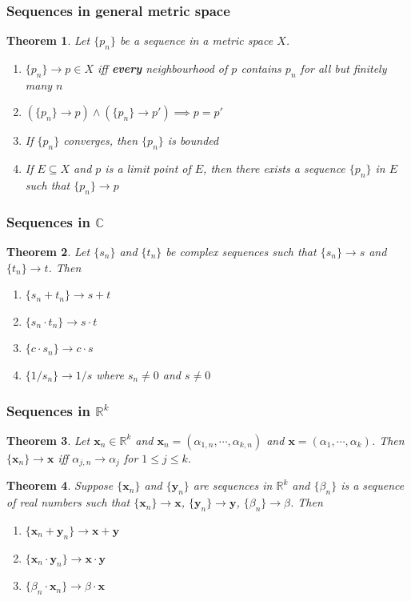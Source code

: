 \documentclass[a4paper,12pt]{report}
\newcommand{\R}{\mathbb{R}}
\newcommand{\tb}{\textbf}
\theoremstyle{plain}
\newtheorem{theorem}{\color{blue}Theorem}[chapter] %
\theoremstyle{definition}
\theoremstyle{remark}
\begin{document}
\subsubsection{Sequences in general metric space}
\begin{theorem}
Let $\{p_n\}$ be a sequence in a metric space $X$.
\begin{enumerate}
\item $\{p_n\}\to p\in X$ \emph{iff} \tb{every} neighbourhood of $p$ contains $p_n$ for all but finitely many $n$
\item $(\{p_n\}\to p)\wedge(\{p_n\}\to p')\implies p=p'$
\item If $\{p_n\}$ converges, then $\{p_n\}$ is bounded
\item If $E\subseteq X$ and $p$ is a limit point of $E$, then there exists a sequence $\{p_n\}$ in $E$ such that $\{p_n\}\to p$
\end{enumerate}
\end{theorem}
\subsubsection{Sequences in $\mathbb{C}$}
\begin{theorem}
Let $\{s_n\}$ and $\{t_n\}$ be complex sequences such that $\{s_n\}\to s$ and $\{t_n\}\to t$. Then
\begin{enumerate}
\item $\{s_n+t_n\}\to s+t$
\item $\{s_n\cdot t_n\}\to s\cdot t$
\item $\{c\cdot s_n\}\to c\cdot s$
\item $\{1/s_n\}\to 1/s$ where $s_n\neq 0$ and $s\neq 0$
\end{enumerate}
\end{theorem}
\subsubsection{Sequences in $\R^k$}
\begin{theorem}
Let $\mathbf{x}_n\in\R^k$ and $\mathbf{x}_n=(\alpha_{1,n},\cdots,\alpha_{k,n})$ and $\mathbf{x}=(\alpha_1,\cdots,\alpha_k)$. Then $\{\mathbf{x}_n\}\to \mathbf{x}$ \emph{iff} $\alpha_{j,n}\to \alpha_j$ for $1\le j\le k$.
\end{theorem}
\begin{theorem}
Suppose $\{\mathbf{x}_n\}$ and $\{\mathbf{y}_n\}$ are sequences in $\R^k$ and $\{\beta_n\}$ is a sequence of real numbers such that $\{\mathbf{x}_n\}\to \mathbf{x}$, $\{\mathbf{y}_n\}\to \mathbf{y}$, $\{\beta_n\}\to \beta$. Then
\begin{enumerate}
\item $\{\mathbf{x}_n+\mathbf{y}_n\}\to\mathbf{x}+\mathbf{y}$
\item $\{\mathbf{x}_n\cdot\mathbf{y}_n\}\to\mathbf{x}\cdot\mathbf{y}$
\item $\{\beta_n\cdot\mathbf{x}_n\}\to \beta\cdot\mathbf{x}$
\end{enumerate}
\end{theorem}
\end{document}
